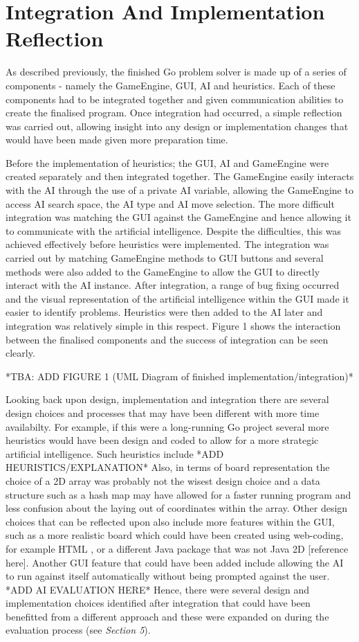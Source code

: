 \documentclass{l3proj}
\begin{document}
\section{Integration And Implementation Reflection}

As described previously, the finished Go problem solver is made up of a series of components - namely the GameEngine, GUI, AI and heuristics. Each of these components had to be integrated together and given communication abilities to create the finalised program. Once integration had occurred, a simple reflection was carried out, allowing insight into any design or implementation changes that would have been made given more preparation time.

Before the implementation of heuristics; the GUI, AI and GameEngine were created separately and then integrated together. The GameEngine easily interacts with the AI through the use of a private AI variable, allowing the GameEngine to access AI search space, the AI type and AI move selection. The more difficult integration was matching the GUI against the GameEngine and hence allowing it to communicate with the artificial intelligence. Despite the difficulties, this was achieved effectively before heuristics were implemented. The integration was carried out by matching GameEngine methods to GUI buttons and several methods were also added to the GameEngine to allow the GUI to directly interact with the AI instance. After integration, a range of bug fixing occurred and the visual representation of the artificial intelligence within the GUI made it easier to identify problems. Heuristics were then added to the AI later and integration was relatively simple in this respect. Figure 1 shows the interaction between the finalised components and the success of integration can be seen clearly.

*TBA: ADD FIGURE 1 (UML Diagram of finished implementation/integration)*

Looking back upon design, implementation and integration there are several design choices and processes that may have been different with more time availabilty. For example, if this were a long-running Go project several more heuristics would have been design and coded to allow for a more strategic artificial intelligence. Such heuristics include *ADD HEURISTICS/EXPLANATION* Also, in terms of board representation the choice of a 2D array was probably not the wisest design choice and a data structure such as a hash map may have allowed for a faster running program and less confusion about the laying out of coordinates within the array. Other design choices that can be reflected upon also include more features within the GUI, such as a more realistic board which could have been created using web-coding, for example HTML \cite{HTMLRef}, or a different Java package that was not Java 2D [reference here]. Another GUI feature that could have been added include allowing the AI to run against itself automatically without being prompted against the user. *ADD AI EVALUATION HERE* Hence, there were several design and implementation choices identified after integration that could have been benefitted from a different approach and these were expanded on during the evaluation process (see \textit{Section 5}).
\end{document}
